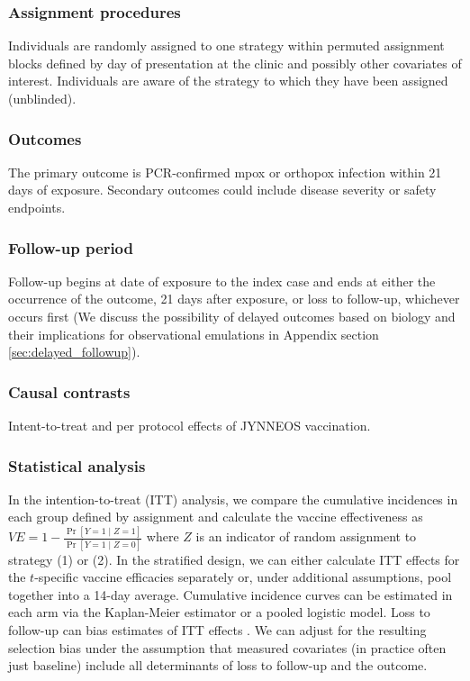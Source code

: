 \begin{appendices}
\begin{refsection}
    \subsubsection*{Assignment procedures}
    Individuals are randomly assigned to one strategy within permuted assignment blocks defined by day of presentation at the clinic and possibly other covariates of interest. Individuals are aware of the strategy to which they have been assigned (unblinded).
    
    \subsubsection*{Outcomes}
    The primary outcome is PCR-confirmed mpox or orthopox infection within 21 days of exposure. Secondary outcomes could include disease severity or safety endpoints. 

    \subsubsection*{Follow-up period}
    Follow-up begins at date of exposure to the index case and ends at either the occurrence of the outcome, 21 days after exposure, or loss to follow-up, whichever occurs first (We discuss the possibility of delayed outcomes based on biology and their implications for observational emulations in Appendix section \ref{sec:delayed_followup}).

    \subsubsection*{Causal contrasts}
    Intent-to-treat and per protocol effects of JYNNEOS vaccination.

    \subsubsection*{Statistical analysis}
    In the intention-to-treat (ITT) analysis, we compare the cumulative incidences in each group defined by assignment and calculate the vaccine effectiveness as $VE = 1 - \frac{\Pr[Y = 1 \mid Z = 1]}{\Pr[Y = 1 \mid Z = 0]}$ where $Z$ is an indicator of random assignment to strategy (1) or (2). In the stratified design, we can either calculate ITT effects for the $t$-specific vaccine efficacies separately or, under additional assumptions, pool together into a 14-day average. Cumulative incidence curves can be estimated in each arm via the Kaplan-Meier estimator or a pooled logistic model. Loss to follow-up can bias estimates of ITT effects \cite{stensrud_why_2020}. We can adjust for the resulting selection bias under the assumption that measured covariates (in practice often just baseline) include all determinants of loss to follow-up and the outcome.


\end{refsection}
\end{appendices}
